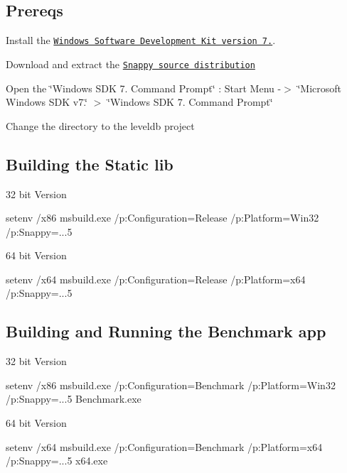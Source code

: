 \subsection*{Prereqs}

Install the \href{http://www.microsoft.com/downloads/dlx/en-us/listdetailsview.aspx?FamilyID=6b6c21d2-2006-4afa-9702-529fa782d63b}{\tt Windows Software Development Kit version 7.}.

Download and extract the \href{http://snappy.googlecode.com/files/snappy-1.0.5.tar.gz}{\tt Snappy source distribution}


\begin{DoxyEnumerate}
\item Open the \char`\"{}\+Windows S\+D\+K 7. Command Prompt\char`\"{} \+: Start Menu -\/$>$ \char`\"{}\+Microsoft Windows S\+D\+K v7.\char`\"{} $>$ \char`\"{}\+Windows S\+D\+K 7. Command Prompt\char`\"{}
\item Change the directory to the leveldb project
\end{DoxyEnumerate}

\subsection*{Building the Static lib}


\begin{DoxyItemize}
\item 32 bit Version \begin{DoxyVerb}  setenv /x86
  msbuild.exe /p:Configuration=Release /p:Platform=Win32 /p:Snappy=...5
\end{DoxyVerb}

\item 64 bit Version \begin{DoxyVerb}  setenv /x64
  msbuild.exe /p:Configuration=Release /p:Platform=x64 /p:Snappy=...5
\end{DoxyVerb}

\end{DoxyItemize}

\subsection*{Building and Running the Benchmark app}


\begin{DoxyItemize}
\item 32 bit Version \begin{DoxyVerb}  setenv /x86
  msbuild.exe /p:Configuration=Benchmark /p:Platform=Win32 /p:Snappy=...5
  Benchmark\leveldb.exe
\end{DoxyVerb}

\item 64 bit Version \begin{DoxyVerb}  setenv /x64
  msbuild.exe /p:Configuration=Benchmark /p:Platform=x64 /p:Snappy=...5
  x64\Benchmark\leveldb.exe\end{DoxyVerb}
 
\end{DoxyItemize}
